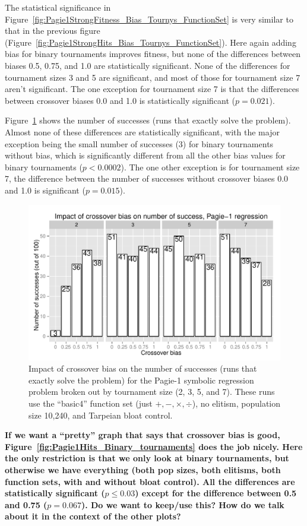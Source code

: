 \documentclass{sig-alternate}
\begin{document}
The statistical significance in Figure~\ref{fig:Pagie1StrongFitness_Bias_Tournys_FunctionSet} is very similar to that in 
the previous figure (Figure~\ref{fig:Pagie1StrongHits_Bias_Tournys_FunctionSet}). Here again adding bias for binary 
tournaments improves fitness, but none of the differences between biases 0.5, 0.75, and 1.0 are statistically 
significant. None of the differences for tournament sizes 3 and 5 are significant, and most of those for tournament size 
7 aren't significant. The one exception for tournament size 7 is that the differences between crossover biases 0.0 and 
1.0 is statistically significant ($p = 0.021$).

Figure~\ref{fig:Pagie1StrongSuccesses} shows the number of successes (runs that exactly solve the problem). 
Almost none of these differences are statistically significant, with the major exception being the small number of 
successes (3) for binary tournaments without bias, which is significantly different from all the other bias values for 
binary tournaments ($p<0.0002$). The one other exception is for tournament size 7, the difference between the 
number of successes without crossover biases 0.0 and 1.0 is significant ($p=0.015$).

\begin{figure}
\centering
\includegraphics[width=0.45 \textwidth]{Plots/Pagie_1_Strong_Successes_vs_Bias.pdf}
\caption{Impact of crossover bias on the number of successes (runs that exactly solve the problem) for the 
Pagie-1 symbolic regression problem broken out by tournament size (2, 3, 5, and 7). These runs use the ``basic4'' 
function set (just $+, -, \times, \div$), no elitism, population size 10,240, and Tarpeian bloat control.}
\label{fig:Pagie1StrongSuccesses}
\end{figure}

\textbf{If we want a ``pretty'' graph that says that crossover bias is good, 
Figure~\ref{fig:Pagie1Hits_Binary_tournaments} does the job nicely. Here the only restriction is that we only look at binary 
tournaments, but otherwise we have everything (both pop sizes, both elitisms, both function sets, with and without 
bloat control). All the differences are statistically significant ($p \leq 0.03$) except for the difference between 0.5 and 
0.75 ($p=0.067$). Do we want to keep/use this? How do we talk about it in the context of the other plots?}
\end{document}
